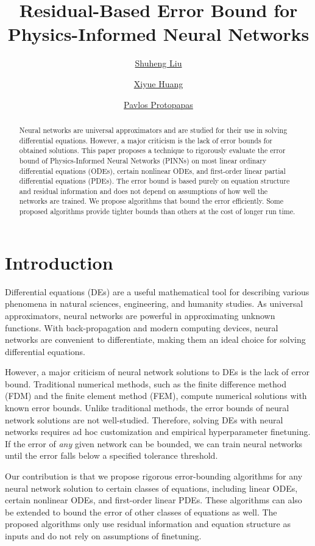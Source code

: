 \documentclass[accepted]{uai2023}
\title{Residual-Based Error Bound for Physics-Informed Neural Networks}
\author[1]{\href{mailto:<shuheng_liu@g.harvard.edu>?Subject=Your UAI 2023 paper}{Shuheng Liu}{}}
\author[2]{\href{mailto:<xh2554@columbia.edu>?Subject=Your UAI 2023 paper}{Xiyue Huang}{}}
\author[3]{\href{mailto:<pavlos@seas.harvard.edu>?Subject=Your UAI 2023 paper}{Pavlos Protopapas}{}}
\affil[1, 3]{
    Institute for Applied Computational Science\\
    Harvard University\\
    Cambridge, Massachusetts, USA
}
\affil[2]{
    Data Science Institute\\
    Columbia University\\
    New York, New York, USA
}
\begin{document}
\maketitle

\begin{abstract}
    Neural networks are universal approximators and are studied for their use in solving differential equations.
    However, a major criticism is the lack of error bounds for obtained solutions.
    This paper proposes a technique to rigorously evaluate the error bound of Physics-Informed Neural Networks (PINNs) on most linear ordinary differential equations (ODEs), certain nonlinear ODEs, and first-order linear partial differential equations (PDEs).
    The error bound is based purely on equation structure and residual information and does not depend on assumptions of how well the networks are trained.
    We propose algorithms that bound the error efficiently. 
    Some proposed algorithms provide tighter bounds than others at the cost of longer run time.
\end{abstract}

\section{Introduction}
    Differential equations (DEs) are a useful mathematical tool for describing various phenomena in natural sciences, engineering, and humanity studies. 
    As universal approximators, neural networks are powerful in approximating unknown functions. 
    With back-propagation and modern computing devices, neural networks are convenient to differentiate, making them an ideal choice for solving differential equations.

    However, a major criticism of neural network solutions to DEs is the lack of error bound. 
    Traditional numerical methods, such as the finite difference method (FDM) and the finite element method (FEM), compute numerical solutions with known error bounds.
    Unlike traditional methods, the error bounds of neural network solutions are not well-studied.
    Therefore, solving DEs with neural networks requires ad hoc customization and empirical hyperparameter finetuning.
    If the error of \textit{any} given network can be bounded, we can train neural networks until the error falls below a specified tolerance threshold.

    Our contribution is that we propose rigorous error-bounding algorithms for any neural network solution to certain classes of equations, including linear ODEs, certain nonlinear ODEs, and first-order linear PDEs.
    These algorithms can also be extended to bound the error of other classes of equations as well.
    The proposed algorithms only use residual information and equation structure as inputs and do not rely on assumptions of finetuning.
\end{document}
